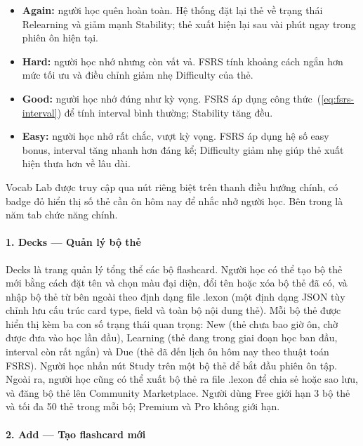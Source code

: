 \begin{itemize}
    \item \textbf{Again:} người học quên hoàn toàn. Hệ thống đặt lại thẻ về trạng thái Relearning và giảm mạnh Stability; thẻ xuất hiện lại sau vài phút ngay trong phiên ôn hiện tại.
    \item \textbf{Hard:} người học nhớ nhưng còn vất vả. FSRS tính khoảng cách ngắn hơn mức tối ưu và điều chỉnh giảm nhẹ Difficulty của thẻ.
    \item \textbf{Good:} người học nhớ đúng như kỳ vọng. FSRS áp dụng công thức~(\ref{eq:fsrs-interval}) để tính interval bình thường; Stability tăng đều.
    \item \textbf{Easy:} người học nhớ rất chắc, vượt kỳ vọng. FSRS áp dụng hệ số easy bonus, interval tăng nhanh hơn đáng kể; Difficulty giảm nhẹ giúp thẻ xuất hiện thưa hơn về lâu dài.
\end{itemize}

Vocab Lab được truy cập qua nút riêng biệt trên thanh điều hướng chính, có badge đỏ hiển thị số thẻ cần ôn hôm nay để nhắc nhở người học. Bên trong là năm tab chức năng chính.

\paragraph{1. Decks --- Quản lý bộ thẻ}

Decks là trang quản lý tổng thể các bộ flashcard. Người học có thể tạo bộ thẻ mới bằng cách đặt tên và chọn màu đại diện, đổi tên hoặc xóa bộ thẻ đã có, và nhập bộ thẻ từ bên ngoài theo định dạng file .lexon (một định dạng JSON tùy chỉnh lưu cấu trúc card type, field và toàn bộ nội dung thẻ). Mỗi bộ thẻ được hiển thị kèm ba con số trạng thái quan trọng: New (thẻ chưa bao giờ ôn, chờ được đưa vào học lần đầu), Learning (thẻ đang trong giai đoạn học ban đầu, interval còn rất ngắn) và Due (thẻ đã đến lịch ôn hôm nay theo thuật toán FSRS). Người học nhấn nút Study trên một bộ thẻ để bắt đầu phiên ôn tập. Ngoài ra, người học cũng có thể xuất bộ thẻ ra file .lexon để chia sẻ hoặc sao lưu, và đăng bộ thẻ lên Community Marketplace. Người dùng Free giới hạn 3 bộ thẻ và tối đa 50 thẻ trong mỗi bộ; Premium và Pro không giới hạn.

\paragraph{2. Add --- Tạo flashcard mới}


